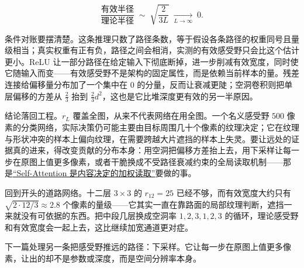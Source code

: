\[
\frac{\text{有效半径}}{\text{理论半径}}\;\sim\;\sqrt{\frac{2}{3L}}\;\xrightarrow[L\to\infty]{}\;0 .
\]

条件对账要摆清楚。这条推理只数了路径条数，等于假设各条路径的权重同号且量级相当；真实权重有正有负，路径之间会相消，实测的有效感受野只会比这个估计更小。ReLU 让一部分路径在给定输入下彻底断掉，进一步削减有效宽度，同时使它随输入而变——有效感受野不是架构的固定属性，而是依赖当前样本的量。残差连接给偏移量分布加了一个集中在 0 的分量，反而让衰减更陡；空洞卷积则把单层偏移的方差从 \(\tfrac{2}{3}\) 抬到 \(\tfrac{2}{3}d^2\)，这也是它比堆深度更有效的另一半原因。

结论落回工程。\(r_L\) 覆盖全图，从来不代表网络在用全图。一个名义感受野 \(500\) 像素的分类网络，实际决策仍可能主要由目标周围几十个像素的纹理决定；它在纹理与形状冲突的样本上偏向纹理，在需要跨越大片遮挡的样本上失灵。要让远处的证据真的进来，得改变贡献的分布本身：用空洞把偏移方差抬上去，用下采样让每一步在原图上值更多像素，或者干脆换成不受路径衰减约束的全局读取机制——那是\hyperref[sec:14-Deep-Learning/05-Attention-and-Sequence-Models/01]{``Self-Attention 是内容决定的加权读取''}要做的事。

回到开头的道路网络。十二层 \(3\times3\) 的 \(r_{12}=25\) 已经不够，而有效宽度大约只有 \(\sqrt{2\cdot12/3}\approx 2.8\) 个像素的量级——它其实一直在靠路面的局部纹理判断，遮挡一来就没有可依据的东西。把中段几层换成空洞率 \(1,2,3,1,2,3\) 的循环，理论感受野和有效宽度会一起上去，这比继续加宽通道更对症。

下一篇处理另一条把感受野推远的路径：下采样。它让每一步在原图上值更多像素，让出的却不是参数或深度，而是空间分辨率本身。
